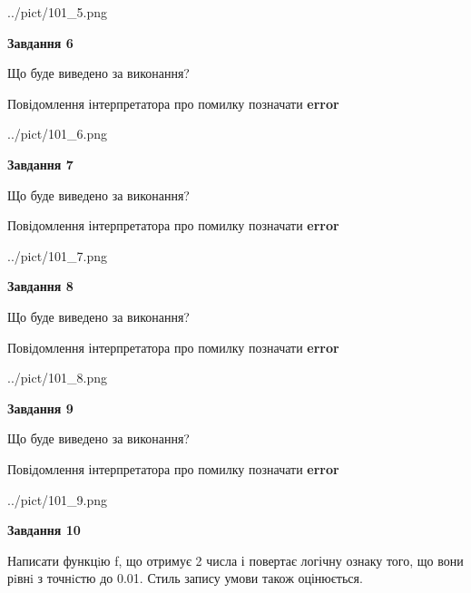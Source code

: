 \documentclass[12pt, ukrainian]{article}
\begin{document}
{\begin {large}
\begin{center}
	{../pict/101_5.png}
\end{center}
\newpage

{\begin {center}\textbf{Завдання 6}\end {center}}\par
Що буде виведено за виконання? \par
Повідомлення інтерпретатора про помилку позначати \textbf{error}

\begin{center}
	{../pict/101_6.png}
\end{center}
\newpage

{\begin {center}\textbf{Завдання 7}\end {center}}\par
Що буде виведено за виконання? \par
Повідомлення інтерпретатора про помилку позначати \textbf{error}

\begin{center}
	{../pict/101_7.png}
\end{center}
\newpage

{\begin {center}\textbf{Завдання 8}\end {center}}\par
Що буде виведено за виконання? \par
Повідомлення інтерпретатора про помилку позначати \textbf{error}

\begin{center}
	{../pict/101_8.png}
\end{center}
\newpage

{\begin {center}\textbf{Завдання 9}\end {center}}\par
Що буде виведено за виконання? \par
Повідомлення інтерпретатора про помилку позначати \textbf{error}

\begin{center}
	{../pict/101_9.png}
\end{center}
\newpage

{\begin {center}\textbf{Завдання 10}\end {center}}\par

Написати функцiю f, що отримує 2 числа і повертає логічну ознаку того, що вони рiвнi з точнiстю до 0.01. Стиль запису умови також оцінюється.\par
\newpage

\end {large}}
\end{document}
